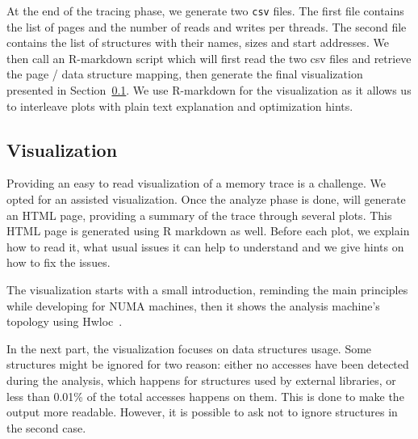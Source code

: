 At the end of the tracing phase, we generate two \texttt{csv} files.
The first file contains the list of pages and the number of reads
and writes per threads. The second file contains the
list of structures with their names, sizes and start addresses.
We then call an R-markdown script which will first read the two csv files and
retrieve the page / data structure mapping, then generate the final
visualization presented in Section~\ref{sec:design-visu}. We use R-markdown
for the visualization as it allows us to interleave plots with plain text
explanation and optimization hints.


\subsection{Visualization}
\label{sec:design-visu}

Providing an easy to read visualization of a memory trace is a challenge. We
opted for an assisted visualization. Once the analyze phase is done, \TABARNAC
will generate an HTML page, providing a summary of the trace through several
plots.  This HTML page is generated using R markdown as well.  Before each
plot, we explain how to read it, what usual issues it can help to understand
and we give hints on how to fix the issues.

The visualization starts with a small introduction, reminding the main
principles while developing for NUMA machines, then it shows the analysis
machine's topology using Hwloc~\cite{Broquedis10hwloc}.

In the next part, the visualization focuses on data structures usage. Some
structures might be ignored for two reason: either no accesses have been
detected during the analysis, which happens for structures used by external
libraries, or less than 0.01\% of the total accesses happens on them. This is
done to make the output more readable. However, it is possible to ask
\TABARNAC not to ignore structures in the second case.

